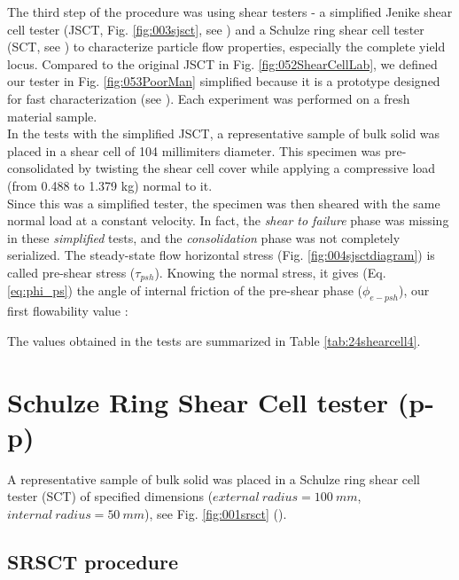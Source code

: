 The third step of the procedure was using shear testers - 
a simplified Jenike shear cell tester (\acs{JSCT}, Fig. \ref{fig:003sjsct}, see
\citet{RefWorks:114}) and a Schulze ring shear cell
tester (\acs{SCT}, see \citet{RefWorks:142}) to characterize particle flow
properties, especially the complete yield locus.
Compared to the original \acs{JSCT} in Fig. \ref{fig:052ShearCellLab}, we
defined our tester in Fig.
\ref{fig:053PoorMan} simplified because it is a prototype designed for fast characterization (see \citet{RefWorks:138}).
Each experiment was performed on a fresh material sample. \\
In the tests with the simplified \acs{JSCT}, a representative sample of bulk solid 
was placed in a shear cell of 104 millimiters diameter. 
This specimen was pre-consolidated by twisting the shear cell cover while applying a 
compressive load (from 0.488 to 1.379 kg) normal to it.\\
Since this was a simplified tester, the specimen was then sheared with the 
same normal load at a constant velocity. 
In fact, the \textit{shear to failure} phase was missing in these \textit{simplified} tests, 
and the \textit{consolidation} phase was not completely serialized.
The steady-state flow horizontal stress (Fig. \ref{fig:004sjsctdiagram}) is
called pre-shear stress ($\tau_{psh}$). 
Knowing the normal stress, it gives (Eq. \ref{eq:phi_ps}) the angle of internal 
friction of the pre-shear phase ($\phi_{e-psh}$), our first flowability value \cite{RefWorks:118}:


The values obtained in the tests are summarized in Table \ref{tab:24shearcell4}.



\section{Schulze Ring Shear Cell tester (p-p)}
\label{sec:SRSCT}


A representative sample of bulk solid was placed in a Schulze ring shear cell
tester (\acs{SCT}) of specified dimensions ($external ~ radius = 100 ~ mm$,
$internal ~ radius = 50 ~ mm$), see Fig. \ref{fig:001srsct}
(\cite{RefWorks:49, RefWorks:51, RefWorks:54, RefWorks:63, RefWorks:103,
RefWorks:104, RefWorks:187}).

\subsection{SRSCT procedure}
\label{subsec:srsctprocedure}

